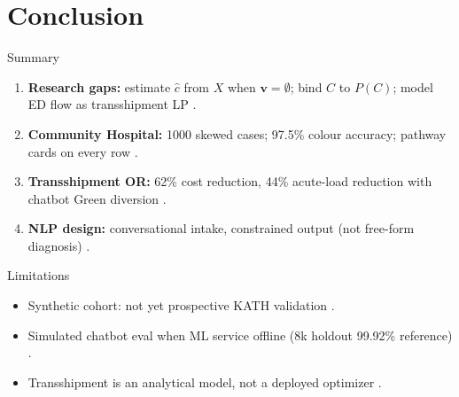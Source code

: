 \section{Conclusion}

\begin{frame}{Summary}
  \small
  \begin{enumerate}
    \item \textbf{Research gaps:} estimate $\hat{c}$ from $X$ when $\mathbf{v}=\emptyset$; bind $C$ to $P(C)$; model ED flow as transshipment LP \citep{Stewart2023, Sundstrom2014, Mitchell2023}.
    \item \textbf{Community Hospital:} 1000 skewed cases; 97.5\% colour accuracy; pathway cards on every row \citep{thisstudy2026, SATS2012}.
    \item \textbf{Transshipment OR:} 62\% cost reduction, 44\% acute-load reduction with chatbot Green diversion \citep{thisstudy2026, Yilmaz2021}.
    \item \textbf{NLP design:} conversational intake, constrained output (not free-form diagnosis) \citep{Stewart2023, Lee2020, Cheng2025}.
  \end{enumerate}
\end{frame}

\begin{frame}{Limitations}
  \small
  \begin{itemize}
    \item Synthetic cohort: not yet prospective KATH validation \citep{thisstudy2026, Rominski2014}.
    \item Simulated chatbot eval when ML service offline (8k holdout 99.92\% reference) \citep{thisstudy2026, Lee2020}.
    \item Transshipment is an analytical model, not a deployed optimizer \citep{thisstudy2026, Mitchell2023}.
  \end{itemize}
\end{frame}

